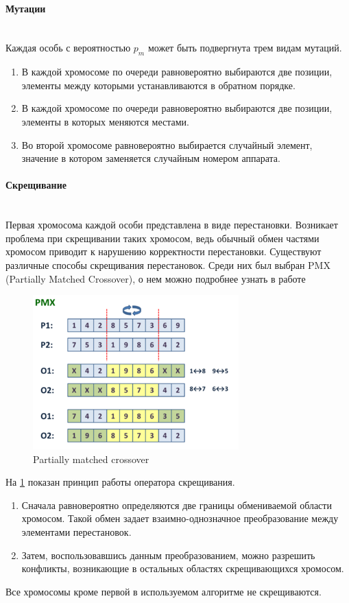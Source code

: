 \documentclass[a4paper,14pt,russian]{article}
\begin{document}
\paragraph{Мутации} ~\\
Каждая особь с вероятностью $p_m$ может быть подвергнута трем видам мутаций.
\begin{enumerate}
\item В каждой хромосоме по очереди равновероятно выбираются две позиции, элементы между которыми устанавливаются в обратном порядке.
\item В каждой хромосоме по очереди равновероятно выбираются две позиции, элементы в которых меняются местами.
\item Во второй хромосоме равновероятно выбирается случайный элемент, значение в котором заменяется случайным номером аппарата.
\end{enumerate}


\paragraph{Скрещивание} ~\\
Первая хромосома каждой особи представлена в виде перестановки. Возникает проблема при скрещивании таких хромосом, ведь обычный обмен частями хромосом приводит к нарушению корректности перестановки. Существуют различные способы скрещивания перестановок. Среди них был выбран PMX (Partially Matched Crossover), о нем можно подробнее узнать в работе \cite{goldberg1985alleles}

\begin{figure}[here]
\includegraphics{images/300px-Pmx.png}
\caption{Partially matched crossover}
\label{fig:pmx}
\end{figure}

На \cref{fig:pmx} показан принцип работы оператора скрещивания.
\begin{enumerate}
\item Сначала равновероятно определяются две границы обмениваемой области хромосом. Такой обмен задает взаимно-однозначное преобразование между элементами перестановок.
\item Затем, воспользовавшись данным преобразованием, можно разрешить конфликты, возникающие в остальных областях скрещивающихся хромосом.
\end{enumerate}
Все хромосомы кроме первой в используемом алгоритме не скрещиваются.
\end{document}
